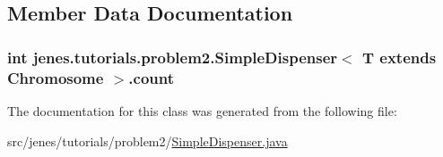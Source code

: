 \subsection{Member Data Documentation}
\hypertarget{classjenes_1_1tutorials_1_1problem2_1_1_simple_dispenser_3_01_t_01extends_01_chromosome_01_4_a89ff326530f8e9ef6486c23766897406}{
\subsubsection[{count}]{\setlength{\rightskip}{0pt plus 5cm}int jenes.\-tutorials.\-problem2.\-Simple\-Dispenser$<$ T extends Chromosome $>$.count\hspace{0.3cm}{\ttfamily [private]}}}\label{classjenes_1_1tutorials_1_1problem2_1_1_simple_dispenser_3_01_t_01extends_01_chromosome_01_4_a89ff326530f8e9ef6486c23766897406}


The documentation for this class was generated from the following file\-:\begin{DoxyCompactItemize}
\item 
src/jenes/tutorials/problem2/\hyperlink{problem2_2_simple_dispenser_8java}{Simple\-Dispenser.\-java}\end{DoxyCompactItemize}
